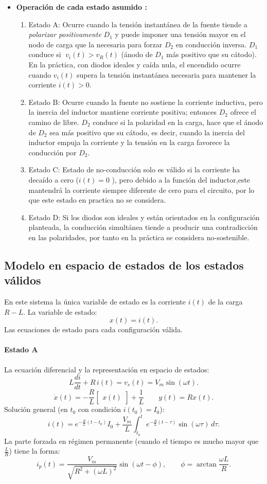 \documentclass[conference]{IEEEtran}
\begin{document}
\begin{itemize}
  \item \textbf{Operación de cada estado asumido :}
    \begin{enumerate}
      \item Estado A: Ocurre cuando la tensión instantánea de la fuente tiende a \emph{polarizar positivamente} \(D_1\) y puede imponer una tensión mayor en el nodo de carga que la necesaria para forzar \(D_2\) en conducción inversa. \(D_1\) conduce si \(\;v_i(t) > v_R(t)\) (ánodo de \(D_1\) más positivo que su cátodo). En la práctica, con diodos ideales y caída nula, el encendido ocurre cuando \(v_i(t)\) supera la tensión instantánea necesaria para mantener la corriente \(i(t)>0\).
      \item Estado B: Ocurre cuando la fuente no sostiene la corriente inductiva, pero la inercia del inductor mantiene corriente positiva; entonces \(D_2\) ofrece el camino de libre. \(D_2\) conduce si la polaridad en la carga, hace que el ánodo de \(D_2\) sea más positivo que su cátodo, es decir, cuando la inercia del inductor empuja la corriente y la tensión en la carga favorece la conducción por \(D_2\). 
      \item Estado C: Estado de no-conducción solo es válido si la corriente ha decaído a cero (\(i(t)=0\)  ), pero debido a la función del inductor,este mantendrá la corriente siempre diferente de cero para el circuito, por lo que este estado en practica no se considera. 
      \item Estado D: Si los diodos son ideales y están orientados en la configuración planteada, la conducción simultánea tiende a producir una contradicción en las polaridades, por tanto en la práctica se considera no-sostenible.
\end{enumerate}
\end{itemize}

 


\subsection{Modelo en espacio de estados de los estados válidos }
En este sistema la única variable de estado es la corriente \(i(t)\) de la carga \(R\!-\!L\). La variable de estado:
\[
x(t)=i(t).
\]
Las ecuaciones de estado para cada configuración válida.
\paragraph{Estado A}
La ecuación diferencial y la representación en espacio de estados:
\[
L\frac{di}{dt} + R\,i(t) = v_s(t) = V_m\sin(\omega t).
\]
\[
\dot{x}(t)
=
-\dfrac{R}{L}
\begin{bmatrix}x(t)\end{bmatrix}
+
\dfrac{1}{L}
\qquad
y(t)=Rx(t).
\]
Solución general (en \(t_0\) con condición \(i(t_0)=I_0\)):
\[
i(t)=e^{-\frac{R}{L}(t-t_0)}I_0 + \frac{V_m}{L}\int_{t_0}^{t} e^{-\frac{R}{L}(t-\tau)}\sin(\omega \tau)\,d\tau.
\]
La parte forzada en régimen permanente (cuando el tiempo es mucho mayor que \(\tfrac{L}{R}\)) tiene la forma:
\[
i_p(t)=\frac{V_m}{\sqrt{R^2+(\omega L)^2}}\sin(\omega t - \phi),\qquad \phi=\arctan\!\frac{\omega L}{R}.
\]
\end{document}
